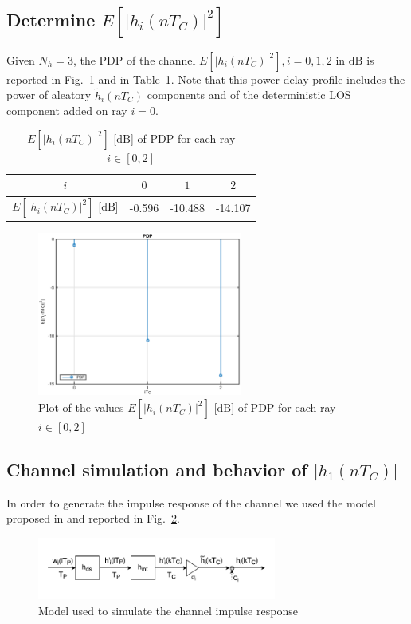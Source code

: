 \documentclass[10pt]{article}
\newcommand{\dB} {\mathrm{dB}}
\begin{document}
\subsection*{Determine $E[|h_i(nT_C)|^2]$}
Given $N_h = 3$, the PDP of the channel $E[|h_i(nT_C)|^2], i = 0, 1, 2$ in $\dB$ is reported in Fig.~\ref{fig:pdp} and in Table~\ref{table:pdp}. Note that this power delay profile includes the power of aleatory $\tilde{h}_i(nT_C)$ components and of the deterministic LOS component added on ray $i = 0$.

\begin{table}[h!]
  \centering
  \begin{tabular}{c|c|c|c}
    $ i $ & $ 0 $ & $ 1 $ & $ 2 $ \\ \hline
    $E[|h_i(nT_C)|^2]$ [$\dB$] & -0.596 & -10.488 & -14.107
  \end{tabular}
  \caption{$E[|h_i(nT_C)|^2]$ [$\dB$] of PDP for each ray $ i \in [0,2]$}
  \label{table:pdp}
\end{table}

\begin{figure}[h!]
  \centering
  \includegraphics[width = 0.6\textwidth]{p01_pdp}
  \caption{Plot of the values $E[|h_i(nT_C)|^2]$ [$\dB$] of PDP for each ray $ i \in [0,2]$}
  \label{fig:pdp}
\end{figure}

\subsection*{Channel simulation and behavior of $|h_1(nT_C)|$}
In order to generate the impulse response of the channel we used the model proposed in \cite{bc} and reported in Fig.~\ref{fig:chimp}.
\begin{figure}[h!]
  \centering
  \includegraphics[width = 0.7\textwidth]{p01_channelmodel}
  \caption{Model used to simulate the channel impulse response}
  \label{fig:chimp}
\end{figure}
\end{document}
